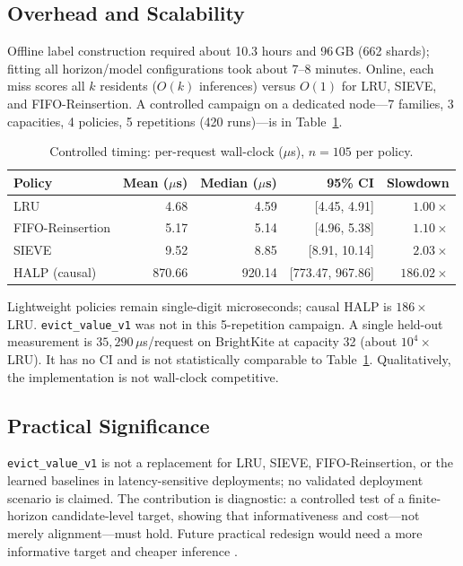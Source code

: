 \documentclass[preprint,12pt]{elsarticle}
\begin{document}
\subsection{Overhead and Scalability}
\label{subsec:overhead_scalability}

Offline label construction required about 10.3 hours and 96\,GB (662 shards); fitting all horizon/model configurations took about 7--8 minutes. Online, each miss scores all $k$ residents ($O(k)$ inferences) versus $O(1)$ for LRU, SIEVE, and FIFO-Reinsertion. A controlled campaign on a dedicated node---7 families, 3 capacities, 4 policies, 5 repetitions (420 runs)---is in Table~\ref{tab:timing-campaign}.

\begin{table}[!htbp]
\centering
\caption{Controlled timing: per-request wall-clock ($\mu$s), $n=105$ per policy.}
\label{tab:timing-campaign}
\renewcommand{\arraystretch}{1.15}
\small
\setlength{\tabcolsep}{4pt}
\begin{tabular}{l r r r r}
\toprule
Policy & Mean ($\mu$s) & Median ($\mu$s) & 95\% CI & Slowdown \\
\midrule
LRU               & 4.68  & 4.59  & [4.45, 4.91]   & $1.00\times$ \\
FIFO-Reinsertion  & 5.17  & 5.14  & [4.96, 5.38]   & $1.10\times$ \\
SIEVE             & 9.52  & 8.85  & [8.91, 10.14]  & $2.03\times$ \\
HALP (causal)     & 870.66 & 920.14 & [773.47, 967.86] & $186.02\times$ \\
\bottomrule
\end{tabular}
\end{table}

Lightweight policies remain single-digit microseconds; causal HALP is $186\times$ LRU. \texttt{evict\_value\_v1} was not in this 5-repetition campaign. A single held-out measurement is $35{,}290\,\mu$s/request on BrightKite at capacity 32 (about $10^{4}\times$ LRU). It has no CI and is not statistically comparable to Table~\ref{tab:timing-campaign}. Qualitatively, the implementation is not wall-clock competitive.

\subsection{Practical Significance}
\label{subsec:practical_significance}

\texttt{evict\_value\_v1} is not a replacement for LRU, SIEVE, FIFO-Reinsertion, or the learned baselines in latency-sensitive deployments; no validated deployment scenario is claimed. The contribution is diagnostic: a controlled test of a finite-horizon candidate-level target, showing that informativeness and cost---not merely alignment---must hold. Future practical redesign would need a more informative target and cheaper inference \cite{yang2023mat,yang2023glcache,xia2026lah,zhou2025threelcache,li2026merlin,yang2023s3fifo,zhang2024sieve}.
\end{document}
